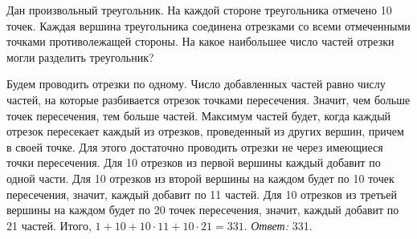 Дан произвольный треугольник.
На каждой стороне треугольника отмечено 10 точек.
Каждая вершина треугольника соединена отрезками со всеми отмеченными точками
противолежащей стороны.
На какое наибольшее число частей отрезки могли разделить треугольник?

\solution
Будем проводить отрезки по одному.
Число добавленных частей равно числу частей, на которые разбивается отрезок
точками пересечения.
Значит, чем больше точек пересечения, тем больше частей.
Максимум частей будет, когда каждый отрезок пересекает каждый из отрезков,
проведенный из других вершин, причем в своей точке.
Для этого достаточно проводить отрезки не через имеющиеся точки пересечения.
Для 10 отрезков из первой вершины каждый добавит по одной части.
Для 10 отрезков из второй вершины на каждом будет по 10 точек пересечения,
значит, каждый добавит по 11 частей.
Для 10 отрезков из третьей вершины на каждом будет по 20 точек пересечения,
значит, каждый добавит по 21 частей.
Итого, $1 + 10 + 10 \cdot 11 + 10 \cdot 21 = 331$.
\emph{Ответ:} 331.

